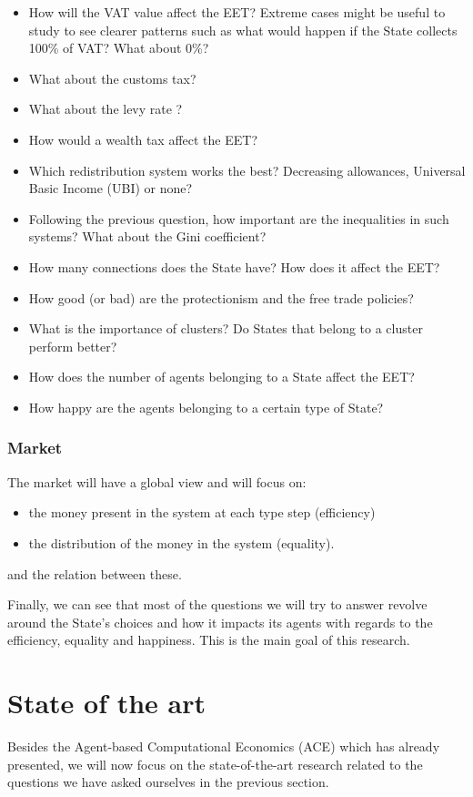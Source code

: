 \documentclass[12pt]{article}
\begin{document}
\begin{itemize}
    \item How will the VAT value affect the EET? Extreme cases might be useful to study to see clearer patterns such as what would happen if the State collects 100\% of VAT? What about 0\%?
    \item What about the customs tax?
    \item What about the levy rate ?
    \item How would a wealth tax affect the EET?
    \item Which redistribution system works the best? Decreasing allowances, Universal Basic Income (UBI) or none?
    \item Following the previous question, how important are the inequalities in such systems? What about the Gini coefficient? 
    \item How many connections does the State have? How does it affect the EET?
    \item How good (or bad) are the protectionism and the free trade policies?
    \item What is the importance of clusters? Do States that belong to a cluster perform better?
    \item How does the number of agents belonging to a State affect the EET?
    \item How happy are the agents belonging to a certain type of State?
\end{itemize}

\subsubsection{Market}
The market will have a global view and will focus on:

\begin{itemize}
    \item the money present in the system at each type step (efficiency)
    \item the distribution of the money in the system (equality).
\end{itemize}

and the relation between these.

Finally, we can see that most of the questions we will try to answer revolve around the State's choices and how it impacts its agents with regards to the efficiency, equality and happiness. This is the main goal of this research.

\section{State of the art}\label{section:state_of_the_art}
Besides the Agent-based Computational Economics (ACE) which has already presented, we will now focus on the state-of-the-art research related to the questions we have asked ourselves in the previous section.
\end{document}
